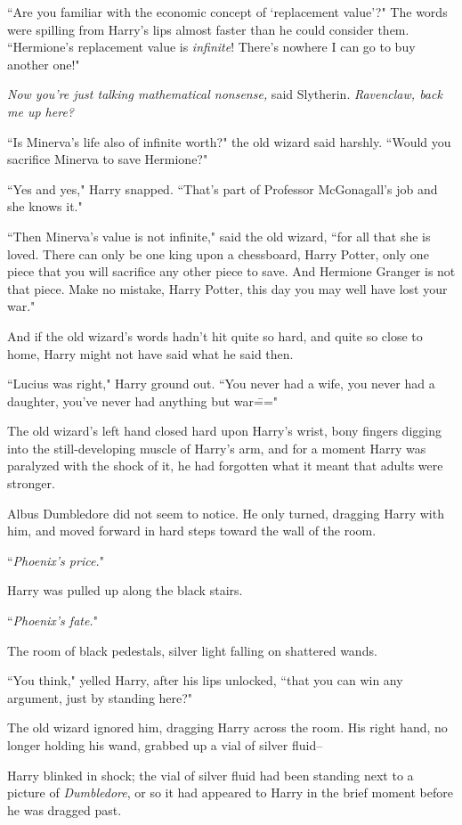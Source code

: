 ``Are you familiar with the economic concept of `replacement value'?" The words were spilling from Harry's lips almost faster than he could consider them. ``Hermione's replacement value is \emph{infinite}! There's nowhere I can go to buy another one!"

\emph{Now you're just talking mathematical nonsense,} said Slytherin. \emph{Ravenclaw, back me up here?}

``Is Minerva's life also of infinite worth?" the old wizard said harshly. ``Would you sacrifice Minerva to save Hermione?"

``Yes and yes," Harry snapped. ``That's part of Professor McGonagall's job and she knows it."

``Then Minerva's value is not infinite," said the old wizard, ``for all that she is loved. There can only be one king upon a chessboard, Harry Potter, only one piece that you will sacrifice any other piece to save. And Hermione Granger is not that piece. Make no mistake, Harry Potter, this day you may well have lost your war."

And if the old wizard's words hadn't hit quite so hard, and quite so close to home, Harry might not have said what he said then.

``Lucius was right," Harry ground out. ``You never had a wife, you never had a daughter, you've never had anything but war\==="

The old wizard's left hand closed hard upon Harry's wrist, bony fingers digging into the still-developing muscle of Harry's arm, and for a moment Harry was paralyzed with the shock of it, he had forgotten what it meant that adults were stronger.

Albus Dumbledore did not seem to notice. He only turned, dragging Harry with him, and moved forward in hard steps toward the wall of the room.

``\emph{Phoenix's price.}"

Harry was pulled up along the black stairs.

``\emph{Phoenix's fate.}"

The room of black pedestals, silver light falling on shattered wands.

``You think," yelled Harry, after his lips unlocked, ``that you can win any argument, just by standing here?"

The old wizard ignored him, dragging Harry across the room. His right hand, no longer holding his wand, grabbed up a vial of silver fluid\---

Harry blinked in shock; the vial of silver fluid had been standing next to a picture of \emph{Dumbledore}, or so it had appeared to Harry in the brief moment before he was dragged past.

